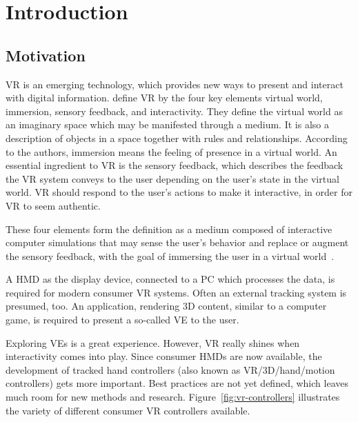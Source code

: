 \chapter{Introduction}\label{chapter:introduction}

\section{Motivation}\label{section:motivation}

\gls{VR} is an emerging technology, which provides new ways to present and interact with digital information. \citeauthor{Sherman.2003} define \gls{VR} by the four key elements virtual world, immersion, sensory feedback, and interactivity. They define the virtual world as an imaginary space which may be manifested through a medium. It is also a description of objects in a space together with rules and relationships. According to the authors, immersion means the feeling of presence in a virtual world. An essential ingredient to \gls{VR} is the sensory feedback, which describes the feedback the \gls{VR} system conveys to the user depending on the user's state in the virtual world. \gls{VR} should respond to the user's actions to make it interactive, in order for \gls{VR} to seem authentic.

These four elements form the definition as a medium composed of interactive computer simulations that may sense the user's behavior and replace or augment the sensory feedback, with the goal of immersing the user in a virtual world~\cite[6-12]{Sherman.2003}.

A \gls{HMD} as the display device, connected to a \gls{PC} which processes the data, is required for modern consumer \gls{VR} systems. Often an external tracking system is presumed, too. An application, rendering \gls{3D} content, similar to a computer game, is required to present a so-called \gls{VE} to the user.

Exploring \glspl{VE} is a great experience. However, \gls{VR} really shines when interactivity comes into play. Since consumer \glspl{HMD} are now available, the development of tracked hand controllers (also known as \gls{VR}/\gls{3D}/hand/motion controllers) gets more important.
Best practices are not yet defined, which leaves much room for new methods and research. Figure~\ref{fig:vr-controllers} illustrates the variety of different consumer \gls{VR} controllers available.

